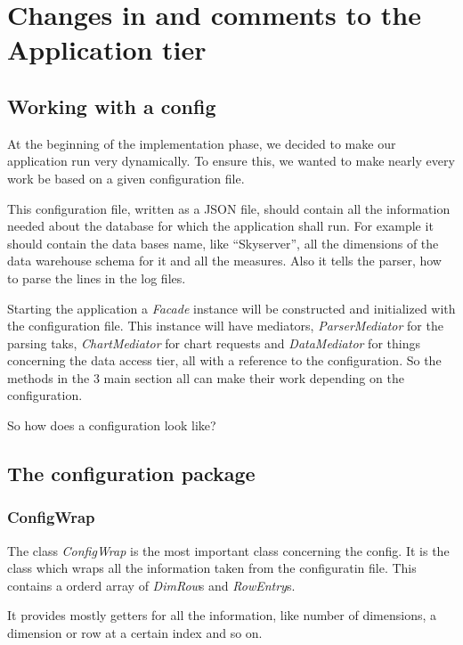 \section{Changes in and comments to the Application tier}





\subsection{Working with a config}
At the beginning of the implementation phase, we decided to make our
application run very dynamically. To ensure this, we wanted to make nearly
every work be based on a given configuration file.

This configuration file, written as a JSON file, should contain
all the information needed about the database for which the application shall run. %
For example it should contain the data bases name, like ``Skyserver'',  all the
dimensions of the data warehouse schema for it and all the measures. Also it
tells the parser, how to parse the lines in the log files.


Starting the application a \textit{Facade} instance will be constructed and initialized
with the configuration file. This instance will have mediators, 
\textit{ParserMediator} for the parsing taks, \textit{ChartMediator} for chart requests
and \textit{DataMediator} for things concerning the data access tier, all with a reference
to the configuration. So the methods in the 3 main section all can make their work depending
on the configuration. 

So how does a configuration look like? %

\subsection{The configuration package}

\subsubsection{ConfigWrap} 
The class \textit{ConfigWrap} is the most important class concerning the config.
It is the class which wraps all the information taken from the configuratin file.
This contains a orderd array of \textit{DimRow}s and \textit{RowEntry}s.
 
It provides mostly getters for all the information, like number of dimensions,
a dimension or row at a certain index and so on.

